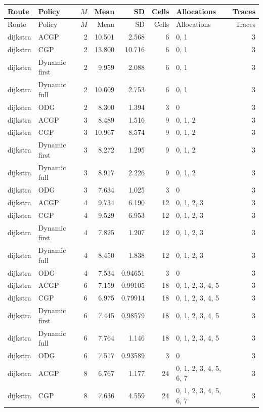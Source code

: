 \documentclass[10pt,a4paper]{article}
\begin{document}
\tiny\setlength{\tabcolsep}{2pt}\begin{longtable}{@{}p{23mm}p{29mm}rrrrp{36mm}r@{}}
\toprule Route & Policy & $M$ & Mean & SD & Cells & Allocations & Traces \\ \midrule\endfirsthead
\toprule Route & Policy & $M$ & Mean & SD & Cells & Allocations & Traces \\ \midrule\endhead
\bottomrule\endfoot
dijkstra & ACGP & 2 & 10.501 & 2.568 & 6 & 0, 1 & 3 \\
dijkstra & CGP & 2 & 13.800 & 10.716 & 6 & 0, 1 & 3 \\
dijkstra & Dynamic first & 2 & 9.959 & 2.088 & 6 & 0, 1 & 3 \\
dijkstra & Dynamic full & 2 & 10.609 & 2.753 & 6 & 0, 1 & 3 \\
dijkstra & ODG & 2 & 8.300 & 1.394 & 3 & 0 & 3 \\
dijkstra & ACGP & 3 & 8.489 & 1.516 & 9 & 0, 1, 2 & 3 \\
dijkstra & CGP & 3 & 10.967 & 8.574 & 9 & 0, 1, 2 & 3 \\
dijkstra & Dynamic first & 3 & 8.272 & 1.295 & 9 & 0, 1, 2 & 3 \\
dijkstra & Dynamic full & 3 & 8.917 & 2.226 & 9 & 0, 1, 2 & 3 \\
dijkstra & ODG & 3 & 7.634 & 1.025 & 3 & 0 & 3 \\
dijkstra & ACGP & 4 & 9.734 & 6.190 & 12 & 0, 1, 2, 3 & 3 \\
dijkstra & CGP & 4 & 9.529 & 6.953 & 12 & 0, 1, 2, 3 & 3 \\
dijkstra & Dynamic first & 4 & 7.825 & 1.207 & 12 & 0, 1, 2, 3 & 3 \\
dijkstra & Dynamic full & 4 & 8.450 & 1.838 & 12 & 0, 1, 2, 3 & 3 \\
dijkstra & ODG & 4 & 7.534 & 0.94651 & 3 & 0 & 3 \\
dijkstra & ACGP & 6 & 7.159 & 0.99105 & 18 & 0, 1, 2, 3, 4, 5 & 3 \\
dijkstra & CGP & 6 & 6.975 & 0.79914 & 18 & 0, 1, 2, 3, 4, 5 & 3 \\
dijkstra & Dynamic first & 6 & 7.445 & 0.98579 & 18 & 0, 1, 2, 3, 4, 5 & 3 \\
dijkstra & Dynamic full & 6 & 7.764 & 1.146 & 18 & 0, 1, 2, 3, 4, 5 & 3 \\
dijkstra & ODG & 6 & 7.517 & 0.93589 & 3 & 0 & 3 \\
dijkstra & ACGP & 8 & 6.767 & 1.177 & 24 & 0, 1, 2, 3, 4, 5, 6, 7 & 3 \\
dijkstra & CGP & 8 & 7.636 & 4.559 & 24 & 0, 1, 2, 3, 4, 5, 6, 7 & 3 \\

\end{longtable}
\end{document}
